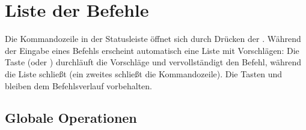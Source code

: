 \documentclass[letterpaper,10pt,german]{sphinxmanual}
\begin{document}
\sphinxstepscope


\section{Liste der Befehle}
\label{\detokenize{cmd_mode:liste-des-commandes}}\label{\detokenize{cmd_mode:cmd-mode}}\label{\detokenize{cmd_mode::doc}}
\sphinxAtStartPar
Die Kommandozeile in der Statusleiste öffnet sich durch Drücken der . Während der Eingabe eines Befehls erscheint automatisch eine Liste mit Vorschlägen: Die \sphinxhyphen{}Taste (oder ) durchläuft die Vorschläge und vervollständigt den Befehl, während  die Liste schließt (ein zweites  schließt die Kommandozeile). Die Tasten  und  bleiben dem Befehlsverlauf vorbehalten.


\subsection{Globale Operationen}
\label{\detokenize{cmd_mode:operations-globales}}\label{\detokenize{cmd_mode:cmd-global}}
\end{document}
